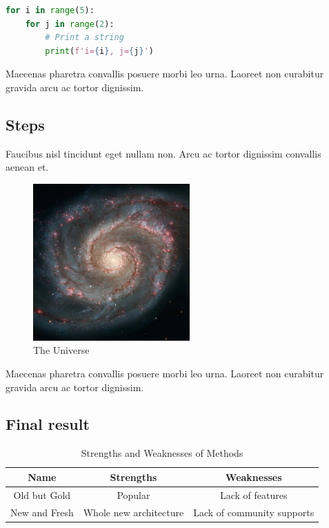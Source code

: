 \documentclass[12pt]{article}
\begin{document}
\blindtext


\begin{lstlisting}[language=Python, caption={Nested for loop in Python}, captionpos=b]
for i in range(5):
    for j in range(2):
        # Print a string
        print(f'i={i}, j={j}')
\end{lstlisting}


Maecenas pharetra convallis posuere morbi leo urna.
Laoreet non curabitur gravida arcu ac tortor dignissim.


\subsection{Steps}



Faucibus nisl tincidunt eget nullam non.
Arcu ac tortor dignissim convallis aenean et.


\begin{figure}[ht]
    \centering
    \includegraphics[width=6cm]{img/universe.jpg}
    \caption{The Universe}
    \label{fig:universe}
\end{figure}


\Blindtext[2]





Maecenas pharetra convallis posuere morbi leo urna.
Laoreet non curabitur gravida arcu ac tortor dignissim.



\subsection{Final result}



\blindtext


\begin{table}[ht]
\centering
    \begin{tabular}{c | c | c}
        Name & Strengths & Weaknesses \\
        \hline
        Old but Gold & Popular & Lack of features \\
        New and Fresh & Whole new architecture & Lack of community supports
    \end{tabular}
\caption{Strengths and Weaknesses of Methods}
\label{tab:method summary}
\end{table}
\end{document}
